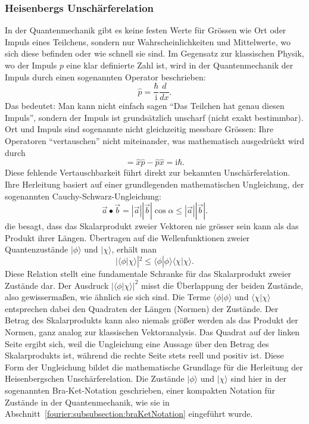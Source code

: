 \subsubsection{Heisenbergs Unschärferelation%
\label{fourier:subsubsection:unschaerferelation}}
In der Quantenmechanik gibt es keine festen Werte für Grössen wie Ort oder Impuls eines Teilchens, sondern nur Wahrscheinlichkeiten und Mittelwerte, wo sich diese befinden oder wie schnell sie sind.
Im Gegensatz zur klassischen Physik, wo der Impuls $p$ eine klar definierte Zahl ist, wird in der Quantenmechanik der Impuls durch einen sogenannten Operator beschrieben:
\begin{equation}
	\hat{p} = \frac{\hbar}{\mathrm{i}} \frac{d}{dx}.
\end{equation}
Das bedeutet:
Man kann nicht einfach sagen ``Das Teilchen hat genau diesen Impuls'', sondern der Impuls ist grundsätzlich unscharf (nicht exakt bestimmbar).
Ort und Impuls sind sogenannte nicht gleichzeitig messbare Grössen:
Ihre Operatoren ``vertauschen'' nicht miteinander, was mathematisch ausgedrückt wird durch
\begin{equation}
	[\hat{x},\hat{p}] = \hat{x} \hat{p} - \hat{p} \hat{x} = \mathrm{i} \hbar.
\end{equation}
Diese fehlende Vertauschbarkeit führt direkt zur bekannten Unschärferelation.
Ihre Herleitung basiert auf einer grundlegenden mathematischen Ungleichung, der sogenannten Cauchy-Schwarz-Ungleichung:
\begin{equation}
	\vec{a} \bullet \vec{b} = |\vec{a}| |\vec{b}|\cos\alpha \le |\vec{a}| |\vec{b}|.
\end{equation}
die besagt, dass das Skalarprodukt zweier Vektoren nie grösser sein kann als das Produkt ihrer Längen.
Übertragen auf die Wellenfunktionen zweier Quantenzustände $|\phi\rangle$ und $|\chi\rangle$, erhält man
\begin{equation}
	|\langle\phi | \chi\rangle|^2 \le \langle\phi | \phi\rangle \langle\chi | \chi\rangle.
\end{equation}
Diese Relation stellt eine fundamentale Schranke für das Skalarprodukt zweier Zustände dar.
Der Ausdruck $|\langle\phi|\chi\rangle|^2$ misst die Überlappung der beiden Zustände, also gewissermaßen, wie ähnlich sie sich sind.
Die Terme $\langle\phi|\phi\rangle$ und $\langle\chi|\chi\rangle$ entsprechen dabei den Quadraten der Längen (Normen) der Zustände.
Der Betrag des Skalarprodukts kann also niemals größer werden als das Produkt der Normen, ganz analog zur klassischen Vektoranalysis.
Das Quadrat auf der linken Seite ergibt sich, weil die Ungleichung eine Aussage über den Betrag des Skalarprodukts ist, während die rechte Seite stets reell und positiv ist.
Diese Form der Ungleichung bildet die mathematische Grundlage für die Herleitung der Heisenbergschen Unschärferelation.
Die Zustände $|\phi\rangle$ und $|\chi\rangle$ sind hier in der sogenannten Bra-Ket-Notation geschrieben, einer kompakten Notation für Zustände in der Quantenmechanik, wie sie in Abschnitt~\ref{fourier:subsubsection:braKetNotation} eingeführt wurde.

